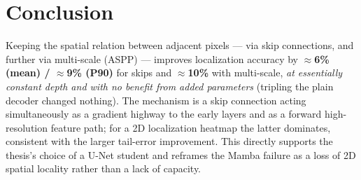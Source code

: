 \documentclass[11pt]{article}
\begin{document}
\section{Conclusion}

Keeping the spatial relation between adjacent pixels --- via skip connections,
and further via multi-scale (ASPP) --- improves localization accuracy by
\textbf{$\approx$6\% (mean) / $\approx$9\% (P90)} for skips and
\textbf{$\approx$10\%} with multi-scale, \emph{at essentially constant depth and
with no benefit from added parameters} (tripling the plain decoder changed
nothing). The mechanism is a skip connection acting simultaneously as a
gradient highway to the early layers and as a forward high-resolution
feature path; for a 2D localization heatmap the latter dominates, consistent with
the larger tail-error improvement. This directly supports the thesis's choice of
a U-Net student and reframes the Mamba failure as a loss of 2D spatial locality
rather than a lack of capacity.
\end{document}
